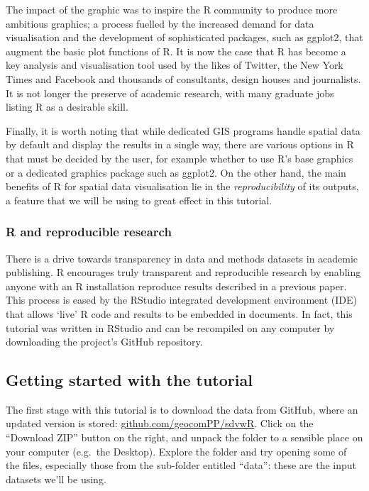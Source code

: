 \documentclass[]{article}
\begin{document}
The impact of the graphic was to inspire the R community to produce more
ambitious graphics; a process fuelled by the increased demand for data
visualisation and the development of sophisticated packages, such as
ggplot2, that augment the basic plot functions of R. It is now the case
that R has become a key analysis and visualisation tool used by the
likes of Twitter, the New York Times and Facebook and thousands of
consultants, design houses and journalists. It is not longer the
preserve of academic research, with many graduate jobs listing R as a
desirable skill.

Finally, it is worth noting that while dedicated GIS programs handle
spatial data by default and display the results in a single way, there
are various options in R that must be decided by the user, for example
whether to use R's base graphics or a dedicated graphics package such as
ggplot2. On the other hand, the main benefits of R for spatial data
visualisation lie in the \emph{reproducibility} of its outputs, a
feature that we will be using to great effect in this tutorial.

\subsubsection{R and reproducible research}

There is a drive towards transparency in data and methods datasets in
academic publishing. R encourages truly transparent and reproducible
research by enabling anyone with an R installation reproduce results
described in a previous paper. This process is eased by the RStudio
integrated development environment (IDE) that allows `live' R code and
results to be embedded in documents. In fact, this tutorial was written
in RStudio and can be recompiled on any computer by downloading the
project's GitHub repository.

\subsection{Getting started with the tutorial}

The first stage with this tutorial is to download the data from GitHub,
where an updated version is stored:
\href{https://github.com/geocomPP/sdvwR}{github.com/geocomPP/sdvwR}.
Click on the ``Download ZIP'' button on the right, and unpack the folder
to a sensible place on your computer (e.g.~the Desktop). Explore the
folder and try opening some of the files, especially those from the
sub-folder entitled ``data'': these are the input datasets we'll be
using.
\end{document}
